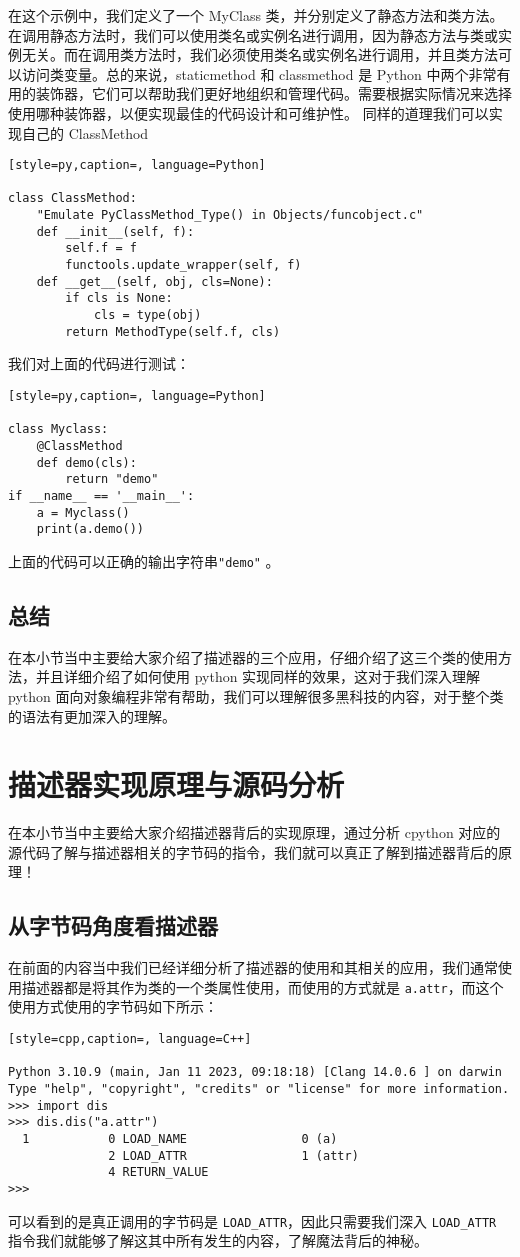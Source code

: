 在这个示例中，我们定义了一个 MyClass 类，并分别定义了静态方法和类方法。在调用静态方法时，我们可以使用类名或实例名进行调用，因为静态方法与类或实例无关。而在调用类方法时，我们必须使用类名或实例名进行调用，并且类方法可以访问类变量。总的来说，staticmethod 和 classmethod 是 Python 中两个非常有用的装饰器，它们可以帮助我们更好地组织和管理代码。需要根据实际情况来选择使用哪种装饰器，以便实现最佳的代码设计和可维护性。
同样的道理我们可以实现自己的 ClassMethod
\begin{lstlisting}[style=py,caption=, language=Python]

class ClassMethod:
    "Emulate PyClassMethod_Type() in Objects/funcobject.c"
    def __init__(self, f):
        self.f = f
        functools.update_wrapper(self, f)
    def __get__(self, obj, cls=None):
        if cls is None:
            cls = type(obj)
        return MethodType(self.f, cls)
\end{lstlisting}
我们对上面的代码进行测试：
\begin{lstlisting}[style=py,caption=, language=Python]

class Myclass:
    @ClassMethod
    def demo(cls):
        return "demo"
if __name__ == '__main__':
    a = Myclass()
    print(a.demo())
\end{lstlisting}
上面的代码可以正确的输出字符串\verb|"demo"| 。
\subsection{总结}
在本小节当中主要给大家介绍了描述器的三个应用，仔细介绍了这三个类的使用方法，并且详细介绍了如何使用 python 实现同样的效果，这对于我们深入理解 python 面向对象编程非常有帮助，我们可以理解很多黑科技的内容，对于整个类的语法有更加深入的理解。


\section{描述器实现原理与源码分析}
在本小节当中主要给大家介绍描述器背后的实现原理，通过分析 cpython 对应的源代码了解与描述器相关的字节码的指令，我们就可以真正了解到描述器背后的原理！
\subsection{从字节码角度看描述器}
在前面的内容当中我们已经详细分析了描述器的使用和其相关的应用，我们通常使用描述器都是将其作为类的一个类属性使用，而使用的方式就是 \verb|a.attr|，而这个使用方式使用的字节码如下所示：
\begin{lstlisting}[style=cpp,caption=, language=C++]

Python 3.10.9 (main, Jan 11 2023, 09:18:18) [Clang 14.0.6 ] on darwin
Type "help", "copyright", "credits" or "license" for more information.
>>> import dis
>>> dis.dis("a.attr")
  1           0 LOAD_NAME                0 (a)
              2 LOAD_ATTR                1 (attr)
              4 RETURN_VALUE
>>>
\end{lstlisting}
可以看到的是真正调用的字节码是 \verb|LOAD_ATTR|，因此只需要我们深入 \verb|LOAD_ATTR| 指令我们就能够了解这其中所有发生的内容，了解魔法背后的神秘。
